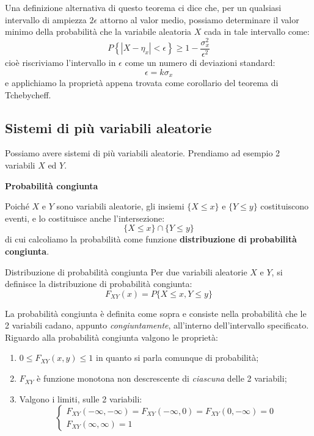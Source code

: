 \documentclass[a4paper,11pt]{article}
\begin{document}
Una definizione alternativa di questo teorema ci dice che, per un qualsiasi intervallo di ampiezza $2 \epsilon$ attorno al valor medio, possiamo determinare il valor minimo della probabilità che la variabile aleatoria $X$ cada in tale intervallo come:
$$
P\left\{ |X - \eta_x| < \epsilon \right\} \geq 1 - \frac{\sigma_x^2}{\epsilon^2}
$$
cioè riscriviamo l'intervallo in $\epsilon$ come un numero di deviazioni standard:
$$
\epsilon = k \sigma_x
$$
e applichiamo la proprietà appena trovata come corollario del teorema di Tchebycheff.

\subsection{Sistemi di più variabili aleatorie}
Possiamo avere sistemi di più variabili aleatorie. Prendiamo ad esempio 2 variabili $X$ ed $Y$. 

\par\smallskip

\noindent
\textbf{\textsf{Probabilità congiunta}}

\noindent
Poiché $X$ e $Y$ sono variabili aleatorie, gli insiemi $\{X \leq x\}$ e $\{Y \leq y\}$ costituiscono eventi, e lo costituisce anche l'intersezione:
$$
\{X \leq x\} \cap \{Y \leq y\}
$$
di cui calcoliamo la probabilità come funzione \textbf{distribuzione di probabilità congiunta}.
\begin{definition}{Distribuzione di probabilità congiunta}
Per due variabili aleatorie $X$ e $Y$, si definisce la distribuzione di probabilità congiunta:
$$
F_{XY}(x) = P\{X \leq x, Y \leq y\}
$$
\end{definition}
La probabilità congiunta è definita come sopra e consiste nella probabilità che le 2 variabili cadano, appunto \textit{congiuntamente}, all'interno dell'intervallo specificato.
Riguardo alla probabilità congiunta valgono le proprietà:
\begin{enumerate}
	\item $0 \leq F_{XY}(x, y) \leq 1$ in quanto si parla comunque di probabilità;
	\item $F_{XY}$ è funzione monotona non descrescente di \textit{ciascuna} delle 2 variabili;
	\item Valgono i limiti, sulle 2 variabili:
\[
\begin{cases}
	F_{XY}(-\infty, -\infty) = F_{XY}(-\infty, 0) = F_{XY}(0, -\infty) = 0 \\
	F_{XY}(\infty, \infty) = 1
\end{cases}
\]
\end{enumerate}
\end{document}
